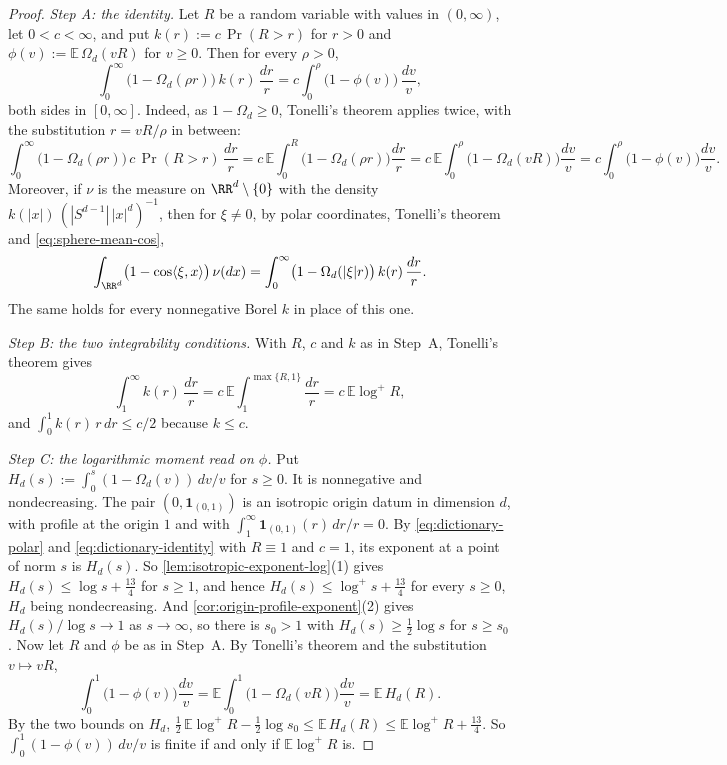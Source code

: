 \begin{proof}
\emph{Step A: the identity.} Let $R$ be a random variable with values in $(0,\infty)$, let
$0 < c < \infty$, and put $k(r) := c\,\Pr(R > r)$ for $r > 0$ and
$\phi(v) := \mathbb{E}\,\Omega_d(vR)$ for $v \ge 0$. Then for every $\rho > 0$,
\begin{equation}\label{eq:dictionary-identity}
  \int_0^\infty\bigl(1 - \Omega_d(\rho r)\bigr)\,k(r)\,\frac{dr}{r}
   = c\int_0^\rho\bigl(1 - \phi(v)\bigr)\,\frac{dv}{v} ,
\end{equation}
both sides in $[0,\infty]$. Indeed, as $1 - \Omega_d \ge 0$, Tonelli's theorem applies twice, with
the substitution $r = vR/\rho$ in between:
\[
  \int_0^\infty\bigl(1 - \Omega_d(\rho r)\bigr)\,c\,\Pr(R > r)\,\frac{dr}{r}
   = c\,\mathbb{E}\int_0^R\bigl(1 - \Omega_d(\rho r)\bigr)\frac{dr}{r}
   = c\,\mathbb{E}\int_0^\rho\bigl(1 - \Omega_d(vR)\bigr)\frac{dv}{v}
   = c\int_0^\rho\bigl(1 - \phi(v)\bigr)\frac{dv}{v} .
\]
Moreover, if $\nu$ is the measure on $\RR^d \setminus \{0\}$ with the density
$k(|x|)\,(|S^{d-1}|\,|x|^d)^{-1}$, then for $\xi \ne 0$, by polar coordinates, Tonelli's theorem
and \ref{eq:sphere-mean-cos},
\begin{equation}\label{eq:dictionary-polar}
  \int_{\RR^d}\bigl(1 - \cos\langle\xi,x\rangle\bigr)\,\nu(dx)
   = \int_0^\infty\bigl(1 - \Omega_d(|\xi| r)\bigr)\,k(r)\,\frac{dr}{r} .
\end{equation}
The same holds for every nonnegative Borel $k$ in place of this one.

\emph{Step B: the two integrability conditions.} With $R$, $c$ and $k$ as in Step~A, Tonelli's
theorem gives
\[
  \int_1^\infty k(r)\,\frac{dr}{r} = c\,\mathbb{E}\int_1^{\max\{R,1\}}\frac{dr}{r}
   = c\,\mathbb{E}\log^+R ,
\]
and $\int_0^1 k(r)\,r\,dr \le c/2$ because $k \le c$.

\emph{Step C: the logarithmic moment read on $\phi$.} Put
$H_d(s) := \int_0^s (1 - \Omega_d(v))\,dv/v$ for $s \ge 0$. It is nonnegative and nondecreasing.
The pair $(0,\mathbf 1_{(0,1)})$ is an isotropic origin datum in dimension $d$, with profile at
the origin $1$ and with $\int_1^\infty\mathbf 1_{(0,1)}(r)\,dr/r = 0$. By
\ref{eq:dictionary-polar} and \ref{eq:dictionary-identity} with $R \equiv 1$ and $c = 1$, its
exponent at a point of norm $s$ is $H_d(s)$. So \ref{lem:isotropic-exponent-log}(1) gives
$H_d(s) \le \log s + \tfrac{13}{4}$ for $s \ge 1$, and hence
$H_d(s) \le \log^+ s + \tfrac{13}{4}$ for every $s \ge 0$, $H_d$ being nondecreasing. And
\ref{cor:origin-profile-exponent}(2) gives $H_d(s)/\log s \to 1$ as $s \to \infty$, so there is
$s_0 > 1$ with $H_d(s) \ge \tfrac12\log s$ for $s \ge s_0$. Now let $R$ and $\phi$ be as in
Step~A. By Tonelli's theorem and the substitution $v \mapsto vR$,
\[
  \int_0^1\bigl(1 - \phi(v)\bigr)\frac{dv}{v}
   = \mathbb{E}\int_0^1\bigl(1 - \Omega_d(vR)\bigr)\frac{dv}{v} = \mathbb{E}\,H_d(R) .
\]
By the two bounds on $H_d$,
$\tfrac12\,\mathbb{E}\log^+R - \tfrac12\log s_0 \le \mathbb{E}\,H_d(R) \le
\mathbb{E}\log^+R + \tfrac{13}{4}$. So $\int_0^1(1 - \phi(v))\,dv/v$ is finite if and only if
$\mathbb{E}\log^+R$ is.


\end{proof}
